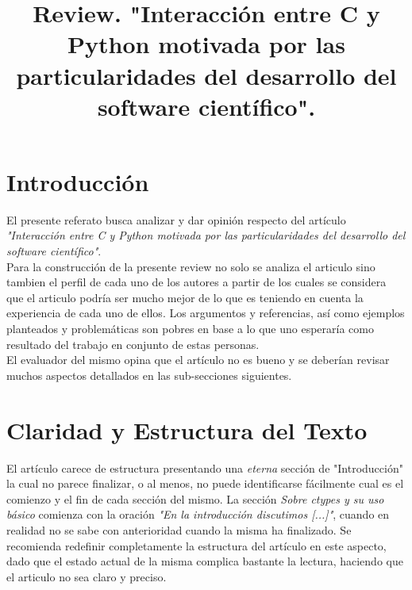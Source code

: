 \documentclass[osajnl,twocolumn,showpacs,superscriptaddress,10pt]{revtex4-1} %
\begin{document}
\title{Review. "Interacción entre C y Python motivada por las particularidades del desarrollo del software científico".}


\begin{abstract}

\end{abstract}

\maketitle %

\section{Introducción}

El presente referato busca analizar y dar opinión respecto del artículo \textit{"Interacción entre C y Python motivada por las particularidades del desarrollo del software científico"}. \\

Para la construcción de la presente review no solo se analiza el articulo sino tambien el perfil de cada uno de los autores a partir de los cuales se considera que el articulo podría ser mucho mejor de lo que es teniendo en cuenta la experiencia de cada uno de ellos. Los argumentos y referencias, así como ejemplos planteados y problemáticas son pobres en base a lo que uno esperaría como resultado del trabajo en conjunto de estas personas. \\

El evaluador del mismo opina que el artículo no es bueno y se deberían revisar muchos aspectos detallados en las sub-secciones siguientes. \\

\section{Claridad y Estructura del Texto}

El artículo carece de estructura presentando una \textit{eterna} sección de "Introducción" la cual no parece finalizar, o al menos, no puede identificarse fácilmente cual es el comienzo y el fin de cada sección del mismo. La sección \textit{Sobre ctypes y su uso básico} comienza con la oración \textit{"En la introducción discutimos [...]"}, cuando en realidad no se sabe con anterioridad cuando la misma ha finalizado. Se recomienda redefinir completamente la estructura del artículo en este aspecto, dado que el estado actual de la misma complica bastante la lectura, haciendo que el articulo no sea claro y preciso. \\
\end{document}
